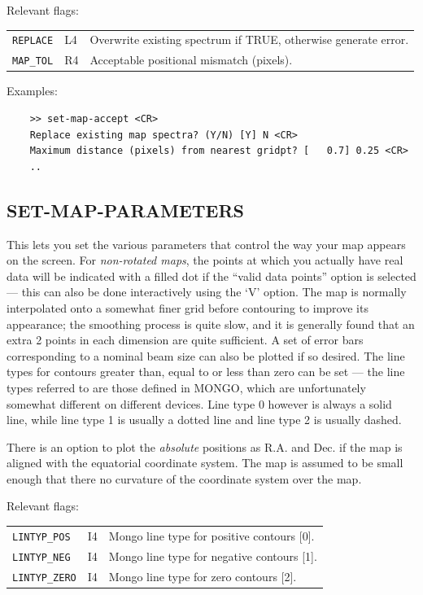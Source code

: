 \documentclass[11pt,twoside]{report}
\begin{document}
Relevant flags:\\
\begin{tabular}{lll}
   \verb+REPLACE+  & L4 & Overwrite existing spectrum if TRUE, otherwise
                          generate error.\\
   \verb+MAP_TOL+  & R4 & Acceptable positional mismatch (pixels).
\end{tabular}

Examples:
\begin{verbatim}
    >> set-map-accept <CR>
    Replace existing map spectra? (Y/N) [Y] N <CR>
    Maximum distance (pixels) from nearest gridpt? [   0.7] 0.25 <CR>
    ..
\end{verbatim}

\subsection{SET-MAP-PARAMETERS} 

This lets you set the various parameters that control the way your
map appears on the screen. For {\em non-rotated maps}, the points at
which you actually have real data will be indicated with a filled dot
if the ``valid data points'' option is selected --- this can also be
done interactively using the `V' option. The map is normally interpolated onto
a somewhat finer grid before contouring to improve its appearance;
 the smoothing process is quite slow, and it is generally
found that an extra 2 points in each dimension are quite sufficient. A set of
error bars corresponding to a nominal beam size can also be plotted if so
desired. The line types for contours greater than, equal to or less than zero
can be set --- the line types  referred to are those
defined in MONGO, which are unfortunately somewhat different on different
devices. Line type 0 however is always a solid line, while line type 1 is
usually a dotted line and line type 2 is usually dashed.

There is an option to plot the {\em absolute} positions as R.A. and Dec. if
the map is aligned with the equatorial coordinate system. The map is assumed
to be small enough that there no curvature of the coordinate system over the
map.

Relevant flags:\\
\begin{tabular}{lll}
  \verb+LINTYP_POS+   & I4 & Mongo line type for positive contours [0].\\
  \verb+LINTYP_NEG+   & I4 & Mongo line type for negative contours [1].\\
  \verb+LINTYP_ZERO+  & I4 & Mongo line type for zero contours [2].
\end{tabular}
\end{document}
